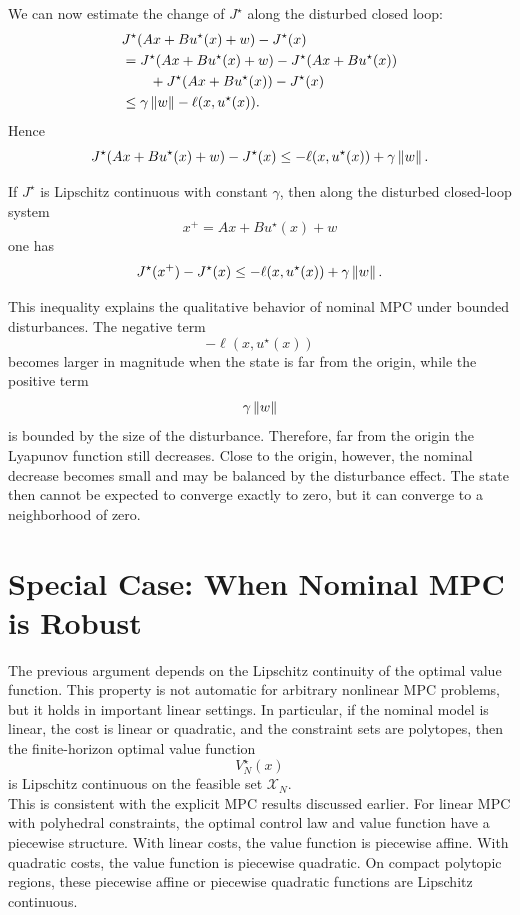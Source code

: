 We can now estimate the change of \(J^\star\) along the disturbed closed loop:
\[
\begin{aligned}
&
J^\star(Ax+Bu^\star(x)+w)-J^\star(x)
\\
&=
J^\star(Ax+Bu^\star(x)+w)
-
J^\star(Ax+Bu^\star(x))
\\
&\qquad
+
J^\star(Ax+Bu^\star(x))
-
J^\star(x)
\\
&\leq
\gamma\left\lVert w \right\rVert
-
\ell(x,u^\star(x)).
\end{aligned}
\]
Hence
\[
    J^\star(Ax+Bu^\star(x)+w)-J^\star(x)
    \leq
    -\ell(x,u^\star(x))+\gamma\left\lVert w \right\rVert.
\]

\begin{theorembox}
If \(J^\star\) is Lipschitz continuous with constant \(\gamma\), then along the disturbed
closed-loop system
\[
    x^+=Ax+Bu^\star(x)+w
\]
one has
\[
    J^\star(x^+)-J^\star(x)
    \leq
    -\ell(x,u^\star(x))+\gamma\left\lVert w \right\rVert.
\]
\end{theorembox}

This inequality explains the qualitative behavior of nominal MPC under bounded disturbances.
The negative term
\[
    -\ell(x,u^\star(x))
\]
becomes larger in magnitude when the state is far from the origin, while the positive term
\[
    \gamma\left\lVert w \right\rVert
\]
is bounded by the size of the disturbance. Therefore, far from the origin the Lyapunov function
still decreases. Close to the origin, however, the nominal decrease becomes small and may be
balanced by the disturbance effect. The state then cannot be expected to converge exactly to
zero, but it can converge to a neighborhood of zero.

\section{Special Case: When Nominal MPC is Robust}

The previous argument depends on the Lipschitz continuity of the optimal value function. This
property is not automatic for arbitrary nonlinear MPC problems, but it holds in important
linear settings. In particular, if the nominal model is linear, the cost is linear or quadratic, and
the constraint sets are polytopes, then the finite-horizon optimal value function
\[
    V_N^\star(x)
\]
is Lipschitz continuous on the feasible set \(\mathcal X_N\).\\

This is consistent with the explicit MPC results discussed earlier. For linear MPC with
polyhedral constraints, the optimal control law and value function have a piecewise structure.
With linear costs, the value function is piecewise affine. With quadratic costs, the value
function is piecewise quadratic. On compact polytopic regions, these piecewise affine or
piecewise quadratic functions are Lipschitz continuous.

